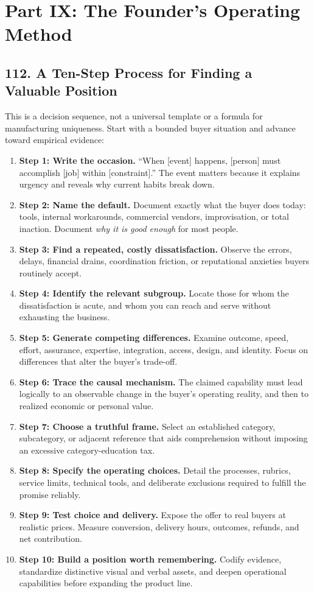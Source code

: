 \section*{Part IX: The Founder's Operating Method}

\subsection*{112. A Ten-Step Process for Finding a Valuable Position}

This is a decision sequence, not a universal template or a formula for manufacturing uniqueness. Start with a bounded buyer situation and advance toward empirical evidence:

\begin{enumerate}
    \item \textbf{Step 1: Write the occasion.} ``When [event] happens, [person] must accomplish [job] within [constraint].'' The event matters because it explains urgency and reveals why current habits break down.
    \item \textbf{Step 2: Name the default.} Document exactly what the buyer does today: tools, internal workarounds, commercial vendors, improvisation, or total inaction. Document \emph{why it is good enough} for most people.
    \item \textbf{Step 3: Find a repeated, costly dissatisfaction.} Observe the errors, delays, financial drains, coordination friction, or reputational anxieties buyers routinely accept.
    \item \textbf{Step 4: Identify the relevant subgroup.} Locate those for whom the dissatisfaction is acute, and whom you can reach and serve without exhausting the business.
    \item \textbf{Step 5: Generate competing differences.} Examine outcome, speed, effort, assurance, expertise, integration, access, design, and identity. Focus on differences that alter the buyer's trade-off.
    \item \textbf{Step 6: Trace the causal mechanism.} The claimed capability must lead logically to an observable change in the buyer's operating reality, and then to realized economic or personal value.
    \item \textbf{Step 7: Choose a truthful frame.} Select an established category, subcategory, or adjacent reference that aids comprehension without imposing an excessive category-education tax.
    \item \textbf{Step 8: Specify the operating choices.} Detail the processes, rubrics, service limits, technical tools, and deliberate exclusions required to fulfill the promise reliably.
    \item \textbf{Step 9: Test choice and delivery.} Expose the offer to real buyers at realistic prices. Measure conversion, delivery hours, outcomes, refunds, and net contribution.
    \item \textbf{Step 10: Build a position worth remembering.} Codify evidence, standardize distinctive visual and verbal assets, and deepen operational capabilities before expanding the product line.
\end{enumerate}


